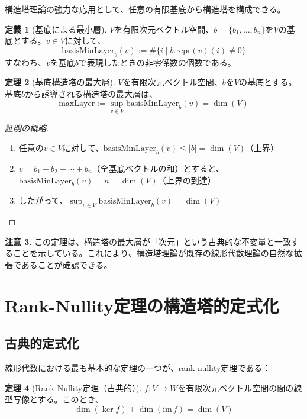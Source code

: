 \documentclass[a4paper,11pt]{ltjsarticle}
\theoremstyle{definition}
\newtheorem{definition}{定義}[section]
\newtheorem{theorem}[definition]{定理}
\newtheorem{remark}[definition]{注意}
\begin{document}
構造塔理論の強力な応用として、任意の有限基底から構造塔を構成できる。

\begin{definition}[基底による最小層]
$V$を有限次元ベクトル空間、$b = \{b_1, \ldots, b_n\}$を$V$の基底とする。$v \in V$に対して、
\[
\mathrm{basisMinLayer}_b(v) := \#\{i \mid b.\mathrm{repr}(v)(i) \neq 0\}
\]
すなわち、$v$を基底$b$で表現したときの非零係数の個数である。
\end{definition}

\begin{theorem}[基底構造塔の最大層]
$V$を有限次元ベクトル空間、$b$を$V$の基底とする。基底$b$から誘導される構造塔の最大層は、
\[
\mathrm{maxLayer} := \sup_{v \in V} \mathrm{basisMinLayer}_b(v) = \dim(V)
\]
\end{theorem}

\begin{proof}[証明の概略]
\begin{enumerate}
  \item 任意の$v \in V$に対して、$\mathrm{basisMinLayer}_b(v) \leq |b| = \dim(V)$（上界）
  \item $v = b_1 + b_2 + \cdots + b_n$（全基底ベクトルの和）とすると、$\mathrm{basisMinLayer}_b(v) = n = \dim(V)$（上界の到達）
  \item したがって、$\sup_{v \in V} \mathrm{basisMinLayer}_b(v) = \dim(V)$
\end{enumerate}
\end{proof}

\begin{remark}
この定理は、構造塔の最大層が「次元」という古典的な不変量と一致することを示している。これにより、構造塔理論が既存の線形代数理論の自然な拡張であることが確認できる。
\end{remark}

\section{Rank-Nullity定理の構造塔的定式化}

\subsection{古典的定式化}

線形代数における最も基本的な定理の一つが、rank-nullity定理である：

\begin{theorem}[Rank-Nullity定理（古典的）]
$f : V \to W$を有限次元ベクトル空間の間の線型写像とする。このとき、
\[
\dim(\ker f) + \dim(\mathrm{im}\, f) = \dim(V)
\]
\end{theorem}
\end{document}
